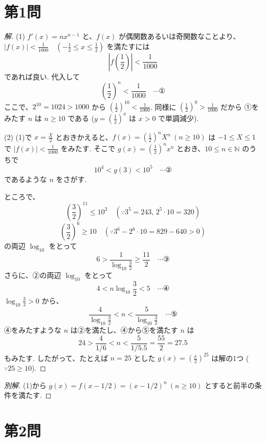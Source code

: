 \documentclass[../main.tex]{subfiles}
\begin{document}
\section*{第1問}

\begin{proof}[解]
  (1) $f'(x) = n x^{n-1}$ と、$f(x)$ が偶関数あるいは奇関数なことより、$|f(x)| < \frac{1}{1000} \quad \left(-\frac{1}{2} \le x \le \frac{1}{2}\right)$ を満たすには
  \[
    \left| f\left(\frac{1}{2}\right) \right| < \frac{1}{1000}
  \]
  であれば良い. 代入して
  \[
    \left(\frac{1}{2}\right)^n < \frac{1}{1000} \quad \cdots \text{①}
  \]
  ここで、$2^{10} = 1024 > 1000$ から $\left(\frac{1}{2}\right)^{10} < \frac{1}{1000}$. 同様に $\left(\frac{1}{2}\right)^9 > \frac{1}{1000}$ だから ①をみたす $n$ は $n \ge 10$ である ($y = \left(\frac{1}{2}\right)^x$ は $x>0$ で単調減少).

  \medskip
  (2) (1)で $x = \frac{X}{2}$ とおきかえると、$f(x) = \left(\frac{1}{2}\right)^n X^n \ (n \ge 10)$ は $-1 \le X \le 1$ で $|f(x)| < \frac{1}{1000}$ をみたす. そこで $g(x) = \left(\frac{1}{2}\right)^n x^n$ とおき、$10 \le n \in \mathbb{N}$ のうちで
  \[
    10^4 < g(3) < 10^5 \quad \cdots \text{②}
  \]
  であるような $n$ をさがす.

  ところで、
  \[
    \left(\frac{3}{2}\right)^{11} \le 10^2 \quad (\because 3^5 = 243, \, 2^5 \cdot 10 = 320)
  \]
  \[
    \left(\frac{3}{2}\right)^6 \ge 10 \quad (\because 3^6 - 2^6 \cdot 10 = 829 - 640 > 0)
  \]
  の両辺 $\log_{10}$ をとって
  \[
    6 > \frac{1}{\log_{10} \frac{3}{2}} \ge \frac{11}{2} \quad \cdots \text{③}
  \]
  さらに、②の両辺 $\log_{10}$ をとって
  \[
    4 < n \log_{10} \frac{3}{2} < 5 \quad \cdots \text{④}
  \]
  $\log_{10} \frac{3}{2} > 0$ から、
  \[
    \frac{4}{\log_{10} \frac{3}{2}} < n < \frac{5}{\log_{10} \frac{3}{2}} \quad \cdots \text{⑤}
  \]
  ④をみたすような $n$ は②を満たし、④から⑤を満たす $n$ は
  \[
    24 > \frac{4}{1/6} < n < \frac{5}{1/5.5} = \frac{55}{2} = 27.5
  \]
  もみたす. したがって、たとえば $n = 25$ とした $g(x) = \left(\frac{x}{2}\right)^{25}$ は解の1つ ($\because 25 \ge 10$).
\end{proof}

\begin{proof}[別解]
  (1)から $g(x) = f(x - 1/2) = (x - 1/2)^n \ (n \ge 10)$ とすると前半の条件を満たす.
\end{proof}

\newpage

\section*{第2問}
\end{document}
